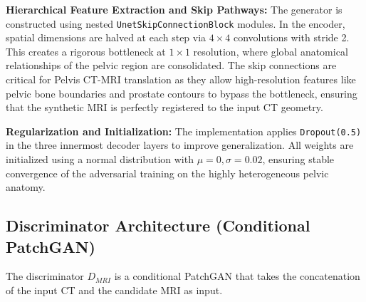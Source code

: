 \documentclass[10pt,a4paper]{article}
\begin{document}
\textbf{Hierarchical Feature Extraction and Skip Pathways:} 
The generator is constructed using nested \texttt{UnetSkipConnectionBlock} modules. In the encoder, spatial dimensions are halved at each step via $4 \times 4$ convolutions with stride 2. This creates a rigorous bottleneck at $1 \times 1$ resolution, where global anatomical relationships of the pelvic region are consolidated. The skip connections are critical for Pelvis CT-MRI translation as they allow high-resolution features like pelvic bone boundaries and prostate contours to bypass the bottleneck, ensuring that the synthetic MRI is perfectly registered to the input CT geometry.

\textbf{Regularization and Initialization:} 
The implementation applies \texttt{Dropout(0.5)} in the three innermost decoder layers to improve generalization. All weights are initialized using a normal distribution with $\mu=0, \sigma=0.02$, ensuring stable convergence of the adversarial training on the highly heterogeneous pelvic anatomy.

\subsection{Discriminator Architecture (Conditional PatchGAN)}
The discriminator $D_{MRI}$ is a conditional PatchGAN that takes the concatenation of the input CT and the candidate MRI as input.
\end{document}
